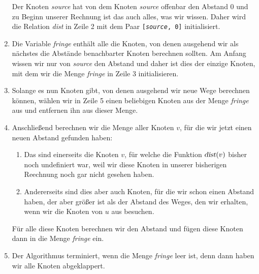\begin{enumerate}
      Der Knoten \textsl{source} hat von dem Knoten \textsl{source} offenbar den Abstand $0$
      und zu Beginn unserer Rechnung ist das auch alles, was wir wissen.  Daher wird die Relation
      \textsl{dist} in Zeile 2 mit dem Paar \texttt{[\textsl{source}, 0]} initialisiert.
\item Die Variable \textsl{fringe} enth\"alt alle die Knoten, von denen ausgehend wir als n\"achstes die
      Abst\"ande benachbarter Knoten berechnen sollten.  Am Anfang wissen wir nur von \textsl{source}
      den Abstand und daher ist dies der einzige Knoten, mit dem wir die Menge \textsl{fringe} 
      in Zeile 3 initialisieren.
\item Solange es nun Knoten gibt, von denen ausgehend wir neue Wege berechnen k\"onnen,
      w\"ahlen wir in Zeile 5 einen beliebigen Knoten aus der Menge \textsl{fringe} aus
      und entfernen ihn aus dieser Menge.  
\item Anschlie{\ss}end berechnen wir die Menge aller Knoten $v$, f\"ur die wir jetzt einen neuen
      Abstand gefunden haben:
      \begin{enumerate}
      \item Das sind einerseits die Knoten $v$, f\"ur welche die Funktion $\textsl{dist}(v)$ bisher noch
            undefiniert war, weil wir diese Knoten in unserer bisherigen Reechnung noch gar nicht gesehen
            haben.
      \item Andererseits sind dies aber auch Knoten, f\"ur die wir schon einen Abstand haben, der aber
            gr\"o{\ss}er ist als der Abstand des Weges, den wir erhalten, wenn wir die Knoten von $u$ aus
            besuchen. 
      \end{enumerate}
      F\"ur alle diese Knoten berechnen wir den Abstand und f\"ugen diese Knoten dann in die Menge 
      \textsl{fringe} ein.
\item Der Algorithmus terminiert, wenn die Menge \textsl{fringe} leer ist, denn dann haben wir alle
      Knoten abgeklappert.
\end{enumerate}

